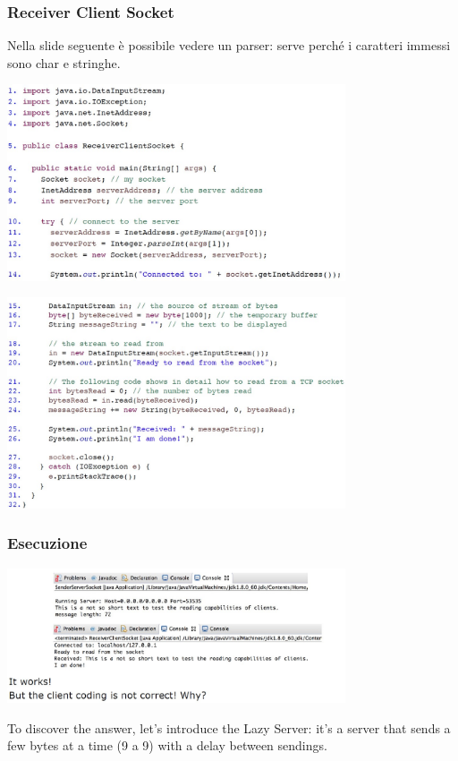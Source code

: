 \subsubsection{Receiver Client Socket}
Nella slide seguente è possibile vedere un parser: serve perché i caratteri immessi sono char e stringhe.
\begin{center}
    \includegraphics[width=0.75\textwidth]{img/ReceiverClientSocket1.jpg}
\end{center}
\begin{center}
    \includegraphics[width=0.75\textwidth]{img/ReceiverClientSocket2.jpg}
\end{center}

\subsubsection{Esecuzione}
\begin{center}
    \includegraphics[width=0.75\textwidth]{img/esecuzione_es_SSS_RCS1.jpg}
\end{center}
To discover the answer, let's introduce the Lazy Server: it's a server that sends a few bytes at a time (9 a 9) with a delay between sendings.


